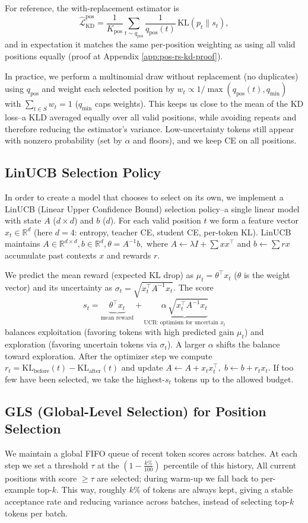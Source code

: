 \documentclass[11pt]{article}
\begin{document}
For reference, the with-replacement estimator is
\[
	\widehat{\mathcal{L}}_{\text{KD}}^{\text{pos}}
	=\frac{1}{K_{\text{pos}}}\sum_{t\sim q_{\text{pos}}}\frac{1}{q_{\text{pos}}(t)}
	\,\mathrm{KL}(p_t\|s_t),
\]
and in expectation it matches the same per-position weighting as using all valid positions equally (proof at Appendix \ref{app:pos-rs-kd-proof}).

In practice, we perform a multinomial draw without replacement (no duplicates) using $q_{\text{pos}}$ and weight each selected position by
$w_t \propto 1/\max(q_{\text{pos}}(t),q_{\min})$ with $\sum_{t\in S} w_t=1$ ($q_{\min}$ caps weights).
This keeps us close to the mean of the KD loss--a KLD averaged equally over all valid positions, while avoiding repeats and therefore reducing the estimator's variance.
Low-uncertainty tokens still appear with nonzero probability (set by $\alpha$ and floors), and we keep CE on all positions.

\subsection{LinUCB Selection Policy}
In order to create a model that chooses to select on its own, we implement a LinUCB (Linear Upper Confidence Bound) selection policy--a single linear model with state $A$ ($d{\times}d$) and $b$ ($d$).
For each valid position $t$ we form a feature vector $x_t\in\mathbb{R}^d$ (here $d{=}4$: entropy, teacher CE, student CE, per-token KL).
LinUCB maintains
\(
A\in\mathbb{R}^{d\times d}, b\in\mathbb{R}^d,
\theta=A^{-1}b,
\)
where $A\!\leftarrow\!\lambda I+\sum x x^\top$ and $b\!\leftarrow\!\sum r x$ accumulate past contexts $x$ and rewards $r$.

We predict the mean reward (expected KL drop) as $\mu_t=\theta^\top x_t$ ($\theta$ is the weight vector) and its uncertainty as
$\sigma_t=\sqrt{x_t^\top A^{-1}x_t}$. The score
\[
	s_t=\underbrace{\theta^\top x_t}_{\text{mean reward}}
	+\underbrace{\alpha\,\sqrt{x_t^\top A^{-1}x_t}}_{\text{UCB: optimism for uncertain }x_t}
\]
balances exploitation (favoring tokens with high predicted gain \(\mu_t\)) and exploration (favoring uncertain tokens via \(\sigma_t\)). A larger \(\alpha\) shifts the balance toward exploration.
After the optimizer step we compute $r_t=\mathrm{KL}_{\text{before}}(t)-\mathrm{KL}_{\text{after}}(t)$ and update
$A\!\leftarrow\!A+x_tx_t^\top,\; b\!\leftarrow\!b+r_tx_t$.
If too few have been selected, we take the highest-$s_t$ tokens up to the allowed budget.

\subsection{GLS (Global-Level Selection) for Position Selection}
We maintain a global FIFO queue of recent token scores across batches.  
At each step we set a threshold $\tau$ at the $(1-\tfrac{k\%}{100})$ percentile of this history,  
All current positions with score $\ge\tau$ are selected; during warm-up we fall back to per-example top-$k$.  
This way, roughly $k\%$ of tokens are always kept, giving a stable acceptance rate and reducing variance across batches, instead of selecting top-$k$ tokens per batch.
\end{document}
